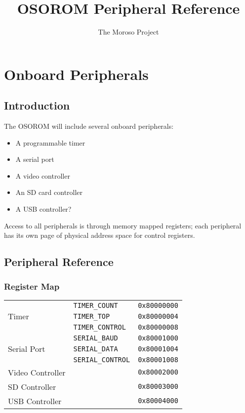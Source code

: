 \documentclass[11pt,openany]{report}
\title{OSOROM Peripheral Reference}
\author{The Moroso Project}
\begin{document}
\maketitle
\tableofcontents

\chapter{Onboard Peripherals}

\section{Introduction}
The OSOROM will include several onboard peripherals:
\begin{itemize}
\item A programmable timer
\item A serial port
\item A video controller
\item An SD card controller
\item A USB controller?
\end{itemize}

Access to all peripherals is through memory mapped registers; each
peripheral has its own page of physical address space for control
registers.

\section{Peripheral Reference}
\subsection{Register Map}
\centering
\begin{tabular}{|l|l|l|}
  \hline
  \multirow{3}{*}{Timer} & \verb|TIMER_COUNT| & \texttt{0x80000000} \\
                         & \verb|TIMER_TOP| & \texttt{0x80000004} \\
                         & \verb|TIMER_CONTROL| & \texttt{0x80000008} \\
  \hline
  \multirow{3}{*}{Serial Port} & \verb|SERIAL_BAUD| & \texttt{0x80001000} \\
                               & \verb|SERIAL_DATA| & \texttt{0x80001004} \\
                               & \verb|SERIAL_CONTROL| & \texttt{0x80001008} \\
  \hline
  Video Controller & & \texttt{0x80002000} \\
  \hline
  SD Controller & & \texttt{0x80003000} \\
  \hline
  USB Controller & & \texttt{0x80004000} \\
  \hline
\end{tabular}
\end{document}

